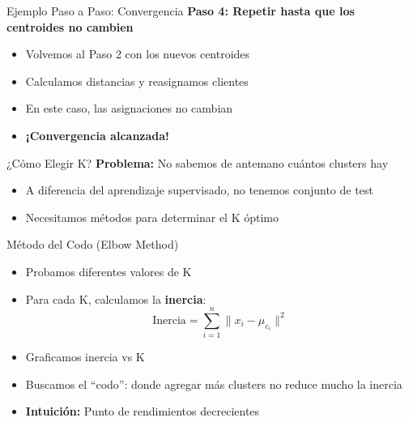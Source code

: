 \documentclass{beamer}
\begin{document}
\begin{frame}{Ejemplo Paso a Paso: Convergencia}
    \textbf{Paso 4: Repetir hasta que los centroides no cambien}

    \vspace{1em}

    \begin{itemize}
        \item<1-> Volvemos al Paso 2 con los nuevos centroides
        \item<2-> Calculamos distancias y reasignamos clientes
        \item<3-> En este caso, las asignaciones no cambian
        \item<4-> \textbf{¡Convergencia alcanzada!}
    \end{itemize}

    \vspace{1em}

\end{frame}

\begin{frame}{¿Cómo Elegir K?}
    \textbf{Problema:} No sabemos de antemano cuántos clusters hay
    \begin{itemize}
        \item<1-> A diferencia del aprendizaje supervisado, no tenemos conjunto de test
        \item<2-> Necesitamos métodos para determinar el K óptimo
    \end{itemize}
\end{frame}

\begin{frame}{Método del Codo (Elbow Method)}
    \begin{itemize}
        \item<1-> Probamos diferentes valores de K
        \item<2-> Para cada K, calculamos la \textbf{inercia}:
        \[
        \text{Inercia} = \sum_{i=1}^{n} \|x_i - \mu_{c_i}\|^2
        \]
        \item<3-> Graficamos inercia vs K
        \item<4-> Buscamos el ``codo'': donde agregar más clusters no reduce mucho la inercia
        \item<5-> \textbf{Intuición:} Punto de rendimientos decrecientes
    \end{itemize}
\end{frame}
\end{document}
